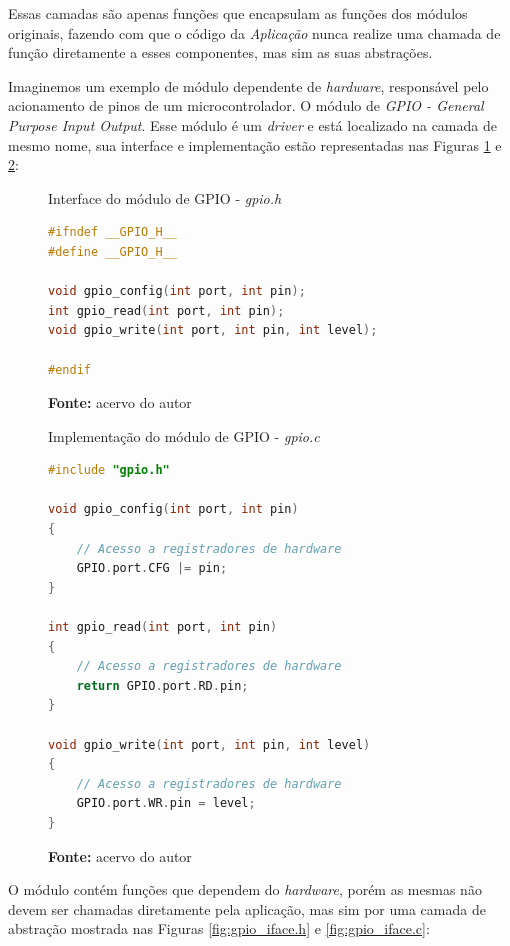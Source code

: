 \documentclass[times, twoside, watermark]{artigo}
\begin{document}
Essas camadas são apenas funções que encapsulam as funções dos módulos originais,
fazendo com que o código da \textit{Aplicação} nunca realize uma chamada de função
diretamente a esses componentes, mas sim as suas abstrações.

Imaginemos um exemplo de módulo dependente de \textit{hardware},
responsável pelo acionamento de pinos de um microcontrolador. O módulo de
\textit{GPIO - General Purpose Input Output}. Esse módulo é um \textit{driver} e está
localizado na camada de mesmo nome, sua interface e implementação estão representadas
nas Figuras \ref{fig:gpio.h} e \ref{fig:gpio.c}:\hfill\\

\begin{figure}[H]
  \centering
  \caption{Interface do módulo de GPIO - \textit{gpio.h}}
\begin{lstlisting}[language=C]
#ifndef __GPIO_H__
#define __GPIO_H__

void gpio_config(int port, int pin);
int gpio_read(int port, int pin);
void gpio_write(int port, int pin, int level);

#endif
\end{lstlisting}
  \label{fig:gpio.h}
  \caption*{\newline\textbf{Fonte:} acervo do autor}
\end{figure}


\begin{figure}[H]
  \centering
  \caption{Implementação do módulo de GPIO - \textit{gpio.c}}
\begin{lstlisting}[language=C]
#include "gpio.h"

void gpio_config(int port, int pin)
{
    // Acesso a registradores de hardware
    GPIO.port.CFG |= pin;
}

int gpio_read(int port, int pin)
{
    // Acesso a registradores de hardware
    return GPIO.port.RD.pin;
}

void gpio_write(int port, int pin, int level)
{
    // Acesso a registradores de hardware
    GPIO.port.WR.pin = level;
}
\end{lstlisting}
  \label{fig:gpio.c}
  \caption*{\newline\textbf{Fonte:} acervo do autor}
\end{figure}

O módulo contém funções que dependem do \textit{hardware}, porém as mesmas não
devem ser chamadas diretamente pela aplicação, mas sim por uma camada de abstração
mostrada nas Figuras \ref{fig:gpio_iface.h} e \ref{fig:gpio_iface.c}:\hfill\\
\end{document}
